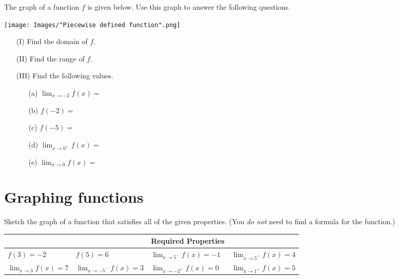 \documentclass[handout,nooutcomes]{ximera}
\begin{document}
\begin{problem}
  \label{problem:reading-properties-of-function-from-graph}
  The graph of a function $f$ is given below.
  Use this graph to answer the following questions.
  \begin{image}
    \texttt{[image: Images/"Piecewise defined function".png]}
  \end{image}
  \begin{itemize}
    \item[(I)]
        Find the domain of $f$.

    \item[(II)]
        Find the range of $f$.

    \item[(III)]
      Find the following values.
      \begin{itemize}
        \item[(a)]
          $\displaystyle \lim_{x \to -2} f(x) = $
        \item[(b)]
          $f(-2) = $
        \item[(c)]
          $f(-5) = $
        \item[(d)]
          $\displaystyle \lim_{x \to 0^+} f(x) = $
        \item[(e)]
          $\displaystyle \lim_{x \to 0} f(x) = $
      \end{itemize}
  \end{itemize}

\end{problem}

\section{Graphing functions}
\label{section:graphing-functions}

\begin{problem}
  \label{problem:sketch-a-graph-using-limits}
   Sketch the graph of a function that satisfies all of the given properties.
  (You \emph{do not} need to find a formula for the function.)
  \begin{center}
    \begin{tabular}[c]{llll}
      \toprule
      & & \hspace{-5em}Required Properties\\
      \midrule
      $f(3) = -2$ & $f(5) = 6$ & $\displaystyle \lim_{x \to 5^-} f(x) = -1$ & $\displaystyle \lim_{x \to 5^+} f(x) = 4$ \\
      $\displaystyle \lim_{x \to 3} f(x) = 7$ & $\displaystyle \lim_{x \to -5^-} f(x) = 3$ & $\displaystyle \lim_{x \to -2^+} f(x) = 0$ & $\displaystyle \lim_{x \to 1^+} f(x) = 5$\\
      \bottomrule
    \end{tabular}
  \end{center}
\end{problem}
\end{document}
